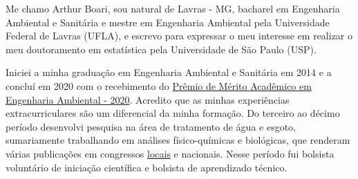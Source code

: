 \documentclass[12pt,a4paper]{article}
\begin{document}
	
	
	Me chamo Arthur Boari, sou natural de Lavras - MG, bacharel em Engenharia Ambiental e Sanitária e mestre em Engenharia Ambiental pela Universidade Federal de Lavras (UFLA), e escrevo para expressar o meu interesse em realizar o meu doutoramento em estatística pela Universidade de São Paulo (USP).
	
	Iniciei a minha graduação em Engenharia Ambiental e Sanitária em 2014 e a concluí em 2020 com o recebimento do \href{https://ufla.br/noticias/ensino/14064-etapa-concluida-mais-de-500-novos-profissionais-formados-pela-ufla}{Prêmio de Mérito Acadêmico em Engenharia Ambiental - 2020}. Acredito que as minhas experiências extracurriculares são um diferencial da minha formação. Do terceiro ao décimo período desenvolvi pesquisa na área de tratamento de água e esgoto, sumariamente trabalhando em análises físico-químicas e biológicas, que renderam várias publicações em congressos \href{https://prp.ufla.br/ciuflasig/library.php}{locais} e nacionais. Nesse período fui bolsista voluntário de iniciação científica e bolsista de aprendizado técnico.
	
\end{document}
